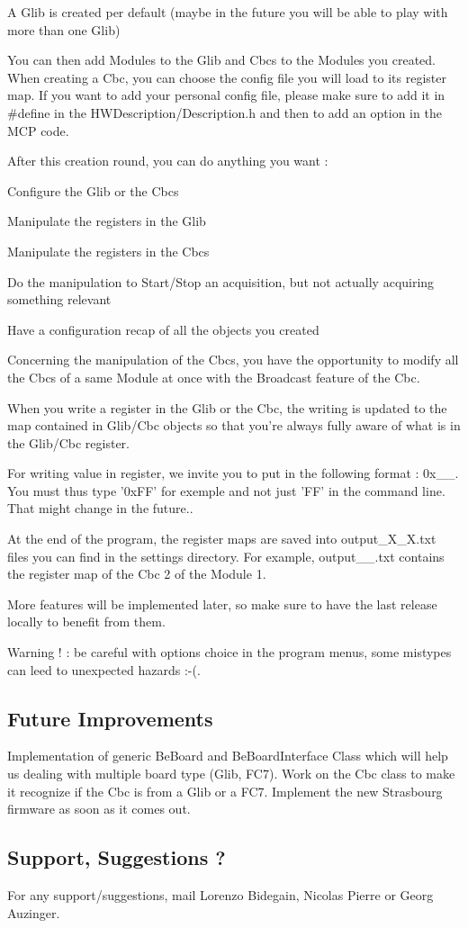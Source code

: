 A Glib is created per default (maybe in the future you will be able to play with more than one Glib)

You can then add Modules to the Glib and Cbcs to the Modules you created. When creating a Cbc, you can choose the config file you will load to its register map. If you want to add your personal config file, please make sure to add it in \#define in the H\-W\-Description/\-Description.\-h and then to add an option in the M\-C\-P code.

After this creation round, you can do anything you want \-:
\begin{DoxyItemize}
\item Configure the Glib or the Cbcs
\item Manipulate the registers in the Glib
\item Manipulate the registers in the Cbcs
\item Do the manipulation to Start/\-Stop an acquisition, but not actually acquiring something relevant
\item Have a configuration recap of all the objects you created
\end{DoxyItemize}

Concerning the manipulation of the Cbcs, you have the opportunity to modify all the Cbcs of a same Module at once with the Broadcast feature of the Cbc.

When you write a register in the Glib or the Cbc, the writing is updated to the map contained in Glib/\-Cbc objects so that you're always fully aware of what is in the Glib/\-Cbc register.

For writing value in register, we invite you to put in the following format \-: 0x\-\_\-\-\_\-. You must thus type '0x\-F\-F' for exemple and not just 'F\-F' in the command line. That might change in the future..

At the end of the program, the register maps are saved into output\-\_\-\-X\-\_\-\-X.\-txt files you can find in the settings directory. For example, output\-\_\-\_.\-txt contains the register map of the Cbc 2 of the Module 1.

More features will be implemented later, so make sure to have the last release locally to benefit from them.

Warning ! \-: be careful with options choice in the program menus, some mistypes can leed to unexpected hazards \-:-\/(.

\subsection*{Future Improvements }

Implementation of generic Be\-Board and Be\-Board\-Interface Class which will help us dealing with multiple board type (Glib, F\-C7). Work on the Cbc class to make it recognize if the Cbc is from a Glib or a F\-C7. Implement the new Strasbourg firmware as soon as it comes out.

\subsection*{Support, Suggestions ? }

For any support/suggestions, mail Lorenzo Bidegain, Nicolas Pierre or Georg Auzinger. 